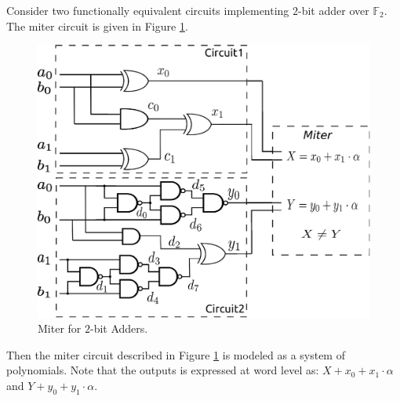 \begin{Example}\label{exp:miter}
	Consider two functionally equivalent circuits implementing $2$-bit adder over $\mathbb{F}_{2}$.
	The miter circuit is given in Figure \ref{fig:2bitadder}.
	\begin{figure}[htb]
		\centerline{
		\includegraphics[scale=0.5]{./figures/2bitadder.eps}
		}
		\caption{Miter for $2$-bit Adders.}
		\label{fig:2bitadder}
	\end{figure}

	Then the miter circuit described in Figure \ref{fig:2bitadder} is modeled as a system of polynomials.
	Note that the outputs is expressed at word level as: $X+x_{0}+x_{1}\cdot \alpha$ and $Y+y_{0}+y_{1}\cdot \alpha	$.


\end{Example}
